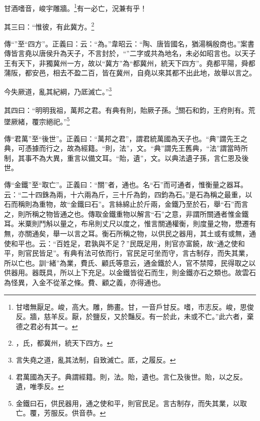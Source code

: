 甘酒嗜音，峻宇雕牆。\footnote{甘嗜無厭足。峻，高大。雕，飾畫。甘，一音戶甘反。嗜，市志反。峻，思俊反。牆，慈羊反。厭，於鹽反，又於豔反。有一於此，未或不亡。”此六者，棄德之君必有其一。}有一必亡，況兼有乎！

其三曰：“惟彼，有此冀方。\footnote{，氏，都冀州，統天下四方。}

{\noindent\zhuan{}\fzbyks 傳“”至“四方”。正義曰：云：“為。”韋昭云：“陶、唐皆國名，猶湯稱殷商也。”案書傳皆言堯以唐侯升為天子，不言封於，“”二字或共為地名，未必如昭言也。以天子王有天下，非獨冀州一方，故以“冀方”為“都冀州，統天下四方”。堯都平陽，舜都蒲阪，都安邑，相去不盈二百，皆在冀州，自堯以來其都不出此地，故舉以言之。 \par}

今失厥道，亂其紀綱，乃厎滅亡。”\footnote{言失堯之道，亂其法制，自致滅亡。厎，之履反。}

其四曰：“明明我祖，萬邦之君。有典有則，貽厥子孫。\footnote{君萬國為天子。典謂經籍。則，法。貽，遺也。言仁及後世。貽，以之反。遺，唯季反。}關石和鈞，王府則有。荒墜厥緒，覆宗絕祀。”\footnote{金鐵曰石，供民器用，通之使和平，則官民足。言古制存，而失其業，以取亡。覆，芳服反。供音恭。}


{\noindent\zhuan{}\fzbyks 傳“君萬”至“後世”。正義曰：“萬邦之君”，謂君統萬國為天子也。“典”謂先王之典，可憑據而行之，故為經籍。“則，法”，文。“典”謂先王舊典，“法”謂當時所制，其事不為大異，重言以備文耳。“貽，遺”，文。以典法遺子孫，言仁恩及後世。 \par}

{\noindent\zhuan{}\fzbyks 傳“金鐵”至“取亡”。正義曰：“關”者，通也。名“石”而可通者，惟衡量之器耳。云：“二十四銖為兩，十六兩為斤，三十斤為鈞，四鈞為石。”是石為稱之最重，以石而稱則為重物，故“金鐵曰石”。言絲綿止於斤兩，金鐵乃至於石，舉“石”而言之，則所稱之物皆通之也。傳取金鐵重物以解言“石”之意，非謂所關通者惟金鐵耳。米粟則鬥斛以量之，布帛則丈尺以度之，惟言關通權衡，則度量之物，懋遷有無，亦關通矣，舉一以言之耳。衡石所稱之物，以供民之器用，其土或有或無，通使和平也。云：“百姓足，君孰與不足？”民既足用，則官亦富饒，故“通之使和平，則官民皆足”。有典有法可依而行，官民足可坐而守，言古制存，而失其業，所以亡也。訓“緒”為業，費氏、顧氏等意云，通金鐵於人，官不禁障，民得取之以供器用。器既具，所以上下充足。以金鐵皆從石而生，則金鐵亦石之類也。故雲石為怪異，入金不從革之條。費、顧之義，亦得通也。 \par}

